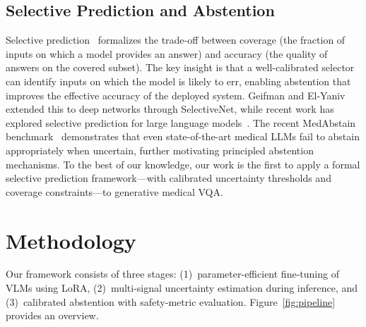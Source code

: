 \documentclass[pdflatex,sn-mathphys-num]{sn-jnl}
\begin{document}
\subsection{Selective Prediction and Abstention}

Selective prediction~\cite{el2010foundations,geifman2017selective} formalizes the trade-off between coverage (the fraction of inputs on which a model provides an answer) and accuracy (the quality of answers on the covered subset). The key insight is that a well-calibrated selector can identify inputs on which the model is likely to err, enabling abstention that improves the effective accuracy of the deployed system. Geifman and El-Yaniv~\cite{geifman2019selectivenet} extended this to deep networks through SelectiveNet, while recent work has explored selective prediction for large language models~\cite{varshney2023stitch}. The recent MedAbstain benchmark~\cite{wen2026medabstain} demonstrates that even state-of-the-art medical LLMs fail to abstain appropriately when uncertain, further motivating principled abstention mechanisms. To the best of our knowledge, our work is the first to apply a formal selective prediction framework---with calibrated uncertainty thresholds and coverage constraints---to generative medical VQA.

\section{Methodology}\label{sec:method}

Our framework consists of three stages: (1)~parameter-efficient fine-tuning of VLMs using LoRA, (2)~multi-signal uncertainty estimation during inference, and (3)~calibrated abstention with safety-metric evaluation. Figure~\ref{fig:pipeline} provides an overview.
\end{document}
